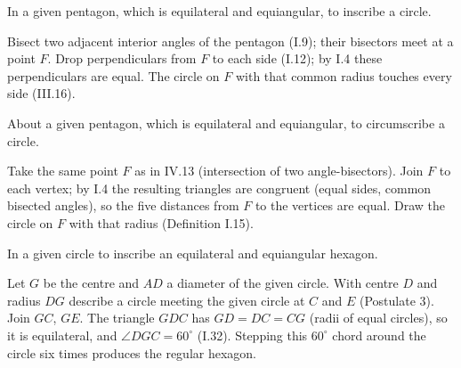 \documentclass{rrxiv}
\begin{document}
\begin{claim}
\label{prop:IV.13}
In a given pentagon, which is equilateral and equiangular, to inscribe
a circle.
\end{claim}
\begin{evidence}[Proof of IV.13]
\label{ev:IV.13}
Bisect two adjacent interior angles of the pentagon (I.9); their
bisectors meet at a point $F$.  Drop perpendiculars from $F$ to each
side (I.12); by I.4 these perpendiculars are equal.  The circle on
$F$ with that common radius touches every side (III.16).
\end{evidence}

\begin{claim}
\label{prop:IV.14}
About a given pentagon, which is equilateral and equiangular, to
circumscribe a circle.
\end{claim}
\begin{evidence}[Proof of IV.14]
\label{ev:IV.14}
Take the same point $F$ as in IV.13 (intersection of two
angle-bisectors).  Join $F$ to each vertex; by I.4 the resulting
triangles are congruent (equal sides, common bisected angles), so the
five distances from $F$ to the vertices are equal.  Draw the circle
on $F$ with that radius (Definition I.15).
\end{evidence}

\begin{claim}
\label{prop:IV.15}
In a given circle to inscribe an equilateral and equiangular hexagon.
\end{claim}
\begin{evidence}[Proof of IV.15]
\label{ev:IV.15}
Let $G$ be the centre and $AD$ a diameter of the given circle.  With
centre $D$ and radius $DG$ describe a circle meeting the given circle
at $C$ and $E$ (Postulate 3).  Join $GC$, $GE$.  The triangle $GDC$
has $GD = DC = CG$ (radii of equal circles), so it is equilateral,
and $\angle DGC = 60^\circ$ (I.32).  Stepping this $60^\circ$ chord
around the circle six times produces the regular hexagon.
\end{evidence}
\end{document}
